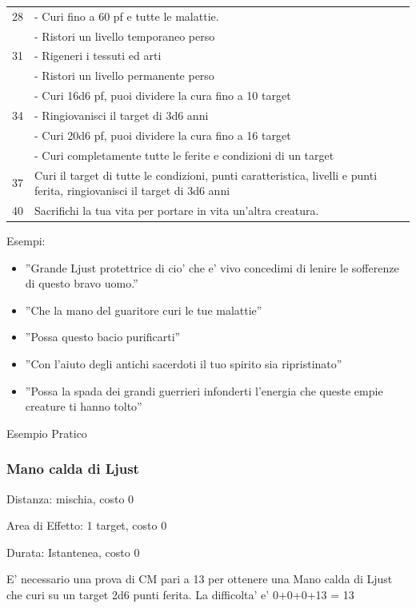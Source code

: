 \documentclass[a4paper,11pt,twoside,openany]{book}
\begin{document}
\begin{longtable}{L{3cm} L{13cm}}
28 &- Curi fino a 60 pf e tutte le malattie.\\
& - Ristori un livello temporaneo perso\\
31 & - Rigeneri i tessuti ed arti\\
& - Ristori un livello permanente perso\\
& - Curi 16d6 pf, puoi dividere la cura fino a 10 target\\
34 & - Ringiovanisci il target di 3d6 anni\\
& - Curi 20d6 pf, puoi dividere la cura fino a 16 target\\
& - Curi completamente tutte le ferite e condizioni di un target\\
37 & Curi il target di tutte le condizioni, punti caratteristica, livelli e punti ferita, ringiovanisci il target di 3d6 anni\\
40 & Sacrifichi la tua vita per portare in vita un’altra creatura.\\
\end{longtable}

\bigskip


Esempi:
\begin{itemize}
\item 
''Grande Ljust protettrice di cio' che e' vivo concedimi di lenire
le sofferenze di questo bravo uomo.'' 
\item 
''Che la mano del guaritore curi le tue malattie'' 
\item 
''Possa questo bacio purificarti'' 
\item 
''Con l'aiuto degli antichi sacerdoti il tuo spirito sia ripristinato'' 
\item 
''Possa la spada dei grandi guerrieri infonderti l'energia che queste empie creature ti hanno tolto'' 
\end{itemize}

\bigskip

Esempio Pratico

\subsubsection{Mano calda di Ljust}

Distanza: mischia, costo 0

Area di Effetto: 1 target, costo 0

Durata: Istantenea, costo 0

E’ necessario una prova di CM pari a 13 per ottenere una Mano calda di Ljust che curi su un target
2d6 punti ferita. La difficolta’ e’ 0+0+0+13 = 13
\end{document}
